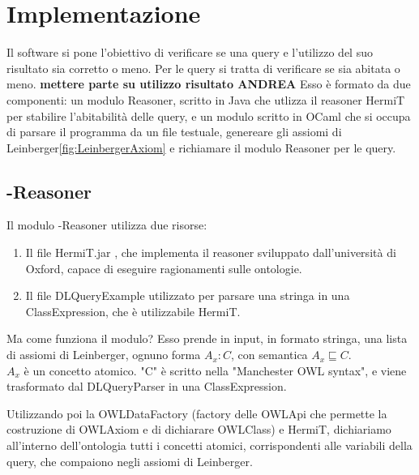 \chapter[Implementazione]{Implementazione}
Il software si pone l'obiettivo di verificare se una query e l'utilizzo del suo risultato sia corretto o meno. Per le query si tratta di verificare se sia abitata o meno. \textbf{mettere parte su utilizzo risultato ANDREA} Esso è formato da due componenti: un modulo Reasoner, scritto in Java che utlizza il reasoner HermiT\cite{HermiT} per stabilire l'abitabilità delle query, e un modulo scritto in OCaml che si occupa di parsare il programma  da un file testuale, genereare gli assiomi di Leinberger\ref{fig:LeinbergerAxiom} e richiamare il modulo Reasoner per le query. 
    
    \section{-Reasoner}
        Il modulo -Reasoner utilizza due risorse: 
            \begin{enumerate}
                \item Il file HermiT.jar \cite{HermiT}, che implementa il reasoner sviluppato dall'università di Oxford, capace di eseguire ragionamenti sulle ontologie.
                \item Il file DLQueryExample \cite{DLQueryExample} utilizzato per parsare una stringa in una ClassExpression, che è utilizzabile HermiT. 
            \end{enumerate}

        Ma come funziona il modulo? Esso prende in input, in formato stringa, una lista di assiomi di Leinberger, ognuno forma \(A_{x} : C\), con semantica \( A_{x}\sqsubseteq C \). 
        \\\(A_{x}\) è un concetto atomico. "C" è scritto nella "Manchester OWL syntax"\cite{ManchesterOWLSyntax}, e viene trasformato dal DLQueryParser in una ClassExpression. 

        Utilizzando poi la OWLDataFactory (factory delle OWLApi che permette la costruzione di OWLAxiom e di dichiarare OWLClass) e HermiT\cite{HermiT}, dichiariamo all'interno dell'ontologia tutti i concetti atomici, corrispondenti alle variabili della query, che compaiono negli assiomi di Leinberger. 

